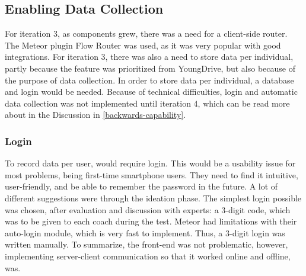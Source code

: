 \subsection{Enabling Data Collection}

For iteration 3, as components grew, there was a need for a client-side router. The Meteor plugin Flow Router was used, as it was very popular with good integrations. For iteration 3, there was also a need to store data per individual, partly because the feature was prioritized from YoungDrive, but also because of the purpose of data collection. In order to store data per individual, a database and login would be needed. Because of technical difficulties, login and automatic data collection was not implemented until iteration 4, which can be read more about in the Discussion in \ref{backwards-capability}.

\subsubsection{Login}
To record data per user, would require login. This would be a usability issue for most problems, being first-time smartphone users. They need to find it intuitive, user-friendly, and be able to remember the password in the future. A lot of different suggestions were through the ideation phase. The simplest login possible was chosen, after evaluation and discussion with experts: a 3-digit code, which was to be given to each coach during the test. Meteor had limitations with their auto-login module, which is very fast to implement. Thus, a 3-digit login was written manually. To summarize, the front-end was not problematic, however, implementing server-client communication so that it worked online and offline, was.



